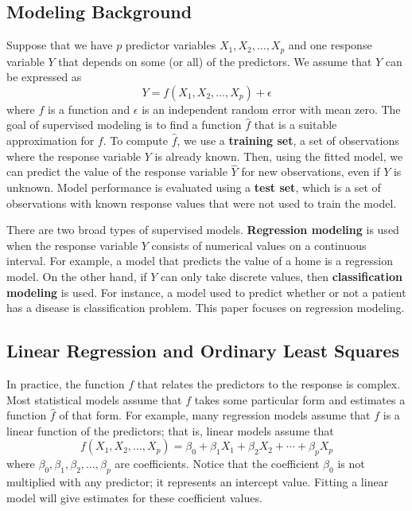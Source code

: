 \documentclass{article}
\begin{document}
\subsection{Modeling Background}

Suppose that we have $p$ predictor variables $X_1, X_2, \dotsc, X_p$ and one response variable $Y$ that depends on some (or all) of the predictors. We assume that $Y$ can be expressed as
\begin{equation}\label{eqn:relationship}
	Y = f(X_1, X_2, \dotsc, X_p) + \epsilon
\end{equation}
where $f$ is a function and $\epsilon$ is an independent random error with mean zero. The goal of supervised modeling is to find a function $\hat{f}$ that is a suitable approximation for $f$. To compute $\hat{f}$, we use a \textbf{training set}, a set of observations where the response variable $Y$ is already known. Then, using the fitted model, we can predict the value of the response variable $\hat{Y}$ for new observations, even if $Y$ is unknown. Model performance is evaluated using a \textbf{test set}, which is a set of observations with known response values that were not used to train the model.

There are two broad types of supervised models. \textbf{Regression modeling} is used when the response variable $Y$ consists of numerical values on a continuous interval. For example, a model that predicts the value of a home is a regression model. On the other hand, if $Y$ can only take discrete values, then \textbf{classification modeling} is used. For instance, a model used to predict whether or not a patient has a disease is classification problem. This paper focuses on regression modeling.

\subsection{Linear Regression and Ordinary Least Squares}

In practice, the function $f$ that relates the predictors to the response is complex. Most statistical models assume that $f$ takes some particular form and estimates a function $\hat{f}$ of that form. For example, many regression models assume that $f$ is a linear function of the predictors; that is, linear models assume that
\begin{equation}\label{eqn:linear-model}
	f(X_1, X_2, \dotsc, X_p) = \beta_0 + \beta_1 X_1 + \beta_2 X_2 + \cdots + \beta_p X_p
\end{equation}
where $\beta_0, \beta_1, \beta_2, \dotsc, \beta_p$ are coefficients. Notice that the coefficient $\beta_0$ is not multiplied with any predictor; it represents an intercept value. Fitting a linear model will give estimates for these coefficient values.
\end{document}
